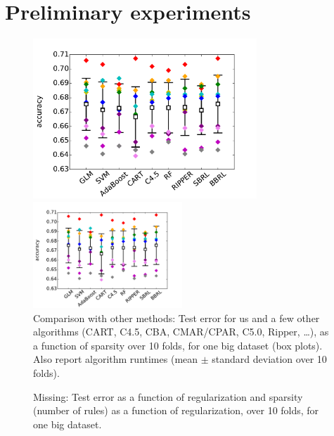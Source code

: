 \section{Preliminary experiments}
\label{sec:experiments}

\begin{figure}[t!]
\begin{center}
\begin{arxiv}
\includegraphics[width=0.75\textwidth]{figs/compare-compas.pdf}
\end{arxiv}
\begin{kdd}
\includegraphics[width=0.5\textwidth]{figs/compare-compas.pdf}
\end{kdd}
\end{center}
\caption{Comparison with other methods:
Test error for us and a few other algorithms
(CART, C4.5, CBA, CMAR/CPAR, C5.0, Ripper, \dots),
as a function of sparsity over 10 folds, for one big dataset (box plots).
Also report algorithm runtimes (mean $\pm$ standard deviation over 10 folds).}
\label{fig:comparison}
\end{figure}

\begin{arxiv}
\begin{figure}[t!]
\begin{center}
\end{center}
\caption{Missing:  Test error as a function of regularization and sparsity
(number of rules) as a function of regularization, over 10 folds,
for one big dataset.}
\label{fig:regularization}
\end{figure}
\end{arxiv}


